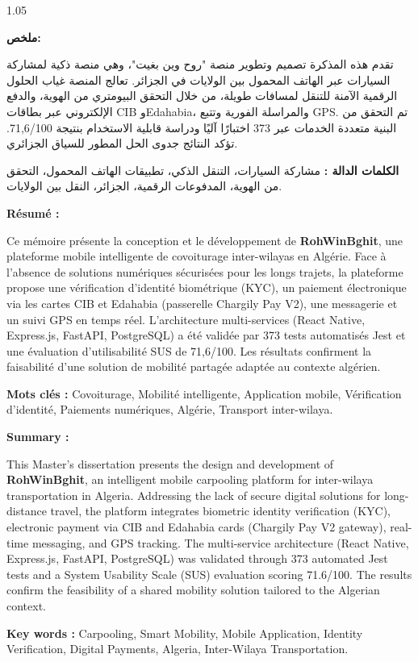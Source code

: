 \thispagestyle{empty}

\begin{spacing}{1.05}
\small

\begin{Arabic}
\noindent\textbf{ملخص:}

تقدم هذه المذكرة تصميم وتطوير منصة "روح وين بغيت"، وهي منصة ذكية لمشاركة السيارات عبر الهاتف المحمول بين الولايات في الجزائر. تعالج المنصة غياب الحلول الرقمية الآمنة للتنقل لمسافات طويلة، من خلال التحقق البيومتري من الهوية، والدفع الإلكتروني عبر بطاقات CIB وEdahabia، والمراسلة الفورية وتتبع GPS. تم التحقق من البنية متعددة الخدمات عبر 373 اختبارًا آليًا ودراسة قابلية الاستخدام بنتيجة 71,6/100. تؤكد النتائج جدوى الحل المطور للسياق الجزائري.

\noindent\textbf{الكلمات الدالة :} مشاركة السيارات، التنقل الذكي، تطبيقات الهاتف المحمول، التحقق من الهوية، المدفوعات الرقمية، الجزائر، النقل بين الولايات.
\end{Arabic}

\vspace{0.6cm}

\noindent\textbf{Résumé :}

Ce mémoire présente la conception et le développement de \textbf{RohWinBghit}, une plateforme mobile intelligente de covoiturage inter-wilayas en Algérie. Face à l'absence de solutions numériques sécurisées pour les longs trajets, la plateforme propose une vérification d'identité biométrique (KYC), un paiement électronique via les cartes CIB et Edahabia (passerelle Chargily Pay V2), une messagerie et un suivi GPS en temps réel. L'architecture multi-services (React Native, Express.js, FastAPI, PostgreSQL) a été validée par 373 tests automatisés Jest et une évaluation d'utilisabilité SUS de 71,6/100. Les résultats confirment la faisabilité d'une solution de mobilité partagée adaptée au contexte algérien.

\noindent\textbf{Mots clés :} Covoiturage, Mobilité intelligente, Application mobile, Vérification d'identité, Paiements numériques, Algérie, Transport inter-wilaya.

\vspace{0.6cm}

\noindent\textbf{Summary :}

This Master's dissertation presents the design and development of \textbf{RohWinBghit}, an intelligent mobile carpooling platform for inter-wilaya transportation in Algeria. Addressing the lack of secure digital solutions for long-distance travel, the platform integrates biometric identity verification (KYC), electronic payment via CIB and Edahabia cards (Chargily Pay V2 gateway), real-time messaging, and GPS tracking. The multi-service architecture (React Native, Express.js, FastAPI, PostgreSQL) was validated through 373 automated Jest tests and a System Usability Scale (SUS) evaluation scoring 71.6/100. The results confirm the feasibility of a shared mobility solution tailored to the Algerian context.

\noindent\textbf{Key words :} Carpooling, Smart Mobility, Mobile Application, Identity Verification, Digital Payments, Algeria, Inter-Wilaya Transportation.

\end{spacing}
